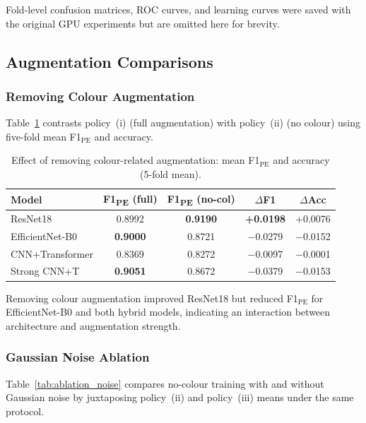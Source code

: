 \documentclass[10pt,journal,compsoc]{IEEEtran}
\begin{document}
Fold-level confusion matrices, ROC curves, and learning curves were saved
with the original GPU experiments but are omitted here for brevity.

\subsection{Augmentation Comparisons}

\subsubsection{Removing Colour Augmentation}
Table~\ref{tab:no_color_delta} contrasts policy~(i) (full augmentation)
with policy~(ii) (no colour) using five-fold mean F1$_{\mathrm{PE}}$ and
accuracy.

\begin{table}[t]
  \caption{Effect of removing colour-related augmentation: mean
    F1$_{\mathrm{PE}}$ and accuracy (5-fold mean).}
  \label{tab:no_color_delta}
  \centering
  \begin{tabular}{lcccc}
    \toprule
    \textbf{Model}
      & \textbf{F1\textsubscript{PE} (full)}
      & \textbf{F1\textsubscript{PE} (no-col)}
      & \textbf{$\Delta$F1}
      & \textbf{$\Delta$Acc} \\
    \midrule
    ResNet18
      & 0.8992 & \textbf{0.9190} & \textbf{+0.0198} & +0.0076 \\
    EfficientNet-B0
      & \textbf{0.9000} & 0.8721 & $-$0.0279 & $-$0.0152 \\
    CNN+Transformer
      & 0.8369 & 0.8272 & $-$0.0097 & $-$0.0001 \\
    Strong CNN+T
      & \textbf{0.9051} & 0.8672 & $-$0.0379 & $-$0.0153 \\
    \bottomrule
  \end{tabular}
\end{table}

Removing colour augmentation improved ResNet18 but reduced F1$_{\mathrm{PE}}$
for EfficientNet-B0 and both hybrid models, indicating an interaction
between architecture and augmentation strength.

\subsubsection{Gaussian Noise Ablation}
Table~\ref{tab:ablation_noise} compares no-colour training with and without
Gaussian noise by juxtaposing policy~(ii) and policy~(iii) means under the
same protocol.
\end{document}
